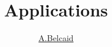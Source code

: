 \documentclass[usenames,dvipsnames]{beamer}
\title{Applications}
\author{\underline{A.Belcaid}}
\institute{\small Université Euromed de Fès}
\begin{document}
\maketitle

\begin{frame}
\tableofcontents
\end{frame}





\end{document}
